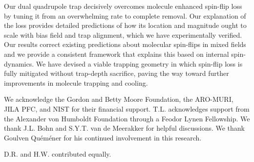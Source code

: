 \documentclass[%
 reprint,
groupedaddress,
 amsmath,amssymb,
 aps,
prl,
]{revtex4-1}
\begin{document}
Our dual quadrupole trap decisively overcomes molecule enhanced spin-flip loss by tuning it from an overwhelming rate to complete removal. Our explanation of the loss provides detailed predictions of how its location and magnitude ought to scale with bias field and trap alignment, which we have experimentally verified. Our results correct existing predictions about molecular spin-flips in mixed fields and we provide a consistent framework that explains this based on internal spin-dynamics. We have devised a viable trapping geometry in which spin-flip loss is fully mitigated without trap-depth sacrifice, paving the way toward further improvements in molecule trapping and cooling.

We acknowledge the Gordon and Betty Moore Foundation, the ARO-MURI, JILA PFC, and NIST for their financial support. T.L. acknowledges support from the Alexander von Humboldt Foundation through a Feodor Lynen Fellowship. We thank J.L. Bohn and S.Y.T. van de Meerakker for helpful discussions. We thank Goulven Qu\'em\'ener for his continued involvement in this research.

D.R. and H.W. contributed equally.


\end{document}
